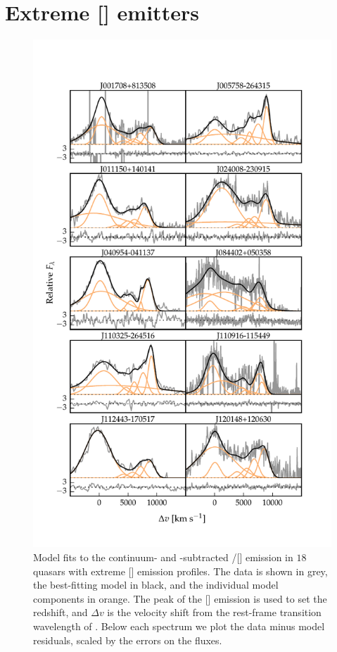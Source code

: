 \section{Extreme [] emitters}
\label{sec:extreme_oiii}

\begin{figure}
    \centering
    \includegraphics[width=\columnwidth]{figures/chapter04/example_spectrum_grid_extreme_oiii_1.pdf} 
    \caption[{Model fits to the continuum- and -subtracted \hbns/[] emission in $18$ quasars with extreme [] emission profiles.}]{Model fits to the continuum- and -subtracted \hbns/[] emission in $18$ quasars with extreme [] emission profiles. The data is shown in grey, the best-fitting model in black, and the individual model components in orange. The peak of the [] emission is used to set the redshift, and $\Delta{v}$ is the velocity shift from the rest-frame transition wavelength of \hbns. Below each spectrum we plot the data minus model residuals, scaled by the errors on the fluxes.}     
    \label{fig:example_spectrum_grid_extreme_oiii}
\end{figure}

